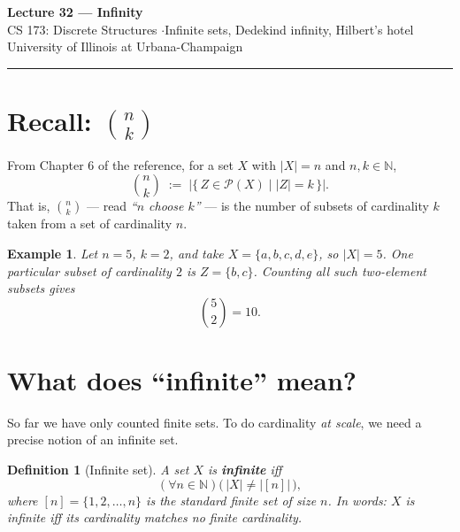 \documentclass[11pt]{article}
\theoremstyle{defstyle}
\newtheorem{definition}{Definition}[section]
\theoremstyle{thmstyle}
\theoremstyle{notstyle}
\newtheorem*{example}{Example}
\theoremstyle{cautionstyle}
\newcommand{\N}{\mathbb{N}}
\newcommand{\Pow}{\mathcal{P}}
\begin{document}
\begin{center}
  {\Large\bfseries Lecture 32 --- Infinity}\\[4pt]
  {\normalsize CS 173: Discrete Structures \quad$\cdot$\quad Infinite sets, Dedekind infinity, Hilbert's hotel}\\[2pt]
  {\small\color{gray} University of Illinois at Urbana-Champaign}
\end{center}
\vspace{1em}\hrule\vspace{1.5em}

\section{Recall: \texorpdfstring{$\binom{n}{k}$}{n choose k}}

From Chapter 6 of the reference, for a set $X$ with $|X| = n$ and $n, k \in \N$,
\[
  \binom{n}{k} \;:=\; \bigl|\{\, Z \in \Pow(X) \;\bigl|\; |Z| = k \,\}\bigr|.
\]
That is, $\binom{n}{k}$ --- read \emph{``$n$ choose $k$''} --- is the number of subsets of cardinality $k$ taken from a set of cardinality $n$.

\begin{notebox}
\begin{example}
Let $n = 5$, $k = 2$, and take $X = \{a, b, c, d, e\}$, so $|X| = 5$. One particular subset of cardinality $2$ is $Z = \{b, c\}$. Counting all such two-element subsets gives
\[
  \binom{5}{2} = 10.
\]
\end{example}
\end{notebox}

\section{What does ``infinite'' mean?}

So far we have only counted finite sets. To do cardinality \emph{at scale}, we need a precise notion of an infinite set.

\begin{defbox}
\begin{definition}[Infinite set]
A set $X$ is \textbf{infinite} iff
\[
  (\forall n \in \N)\bigl(\, |X| \neq |[n]| \,\bigr),
\]
where $[n] = \{1, 2, \ldots, n\}$ is the standard finite set of size $n$. In words: $X$ is infinite iff its cardinality matches no finite cardinality.
\end{definition}
\end{defbox}
\end{document}
